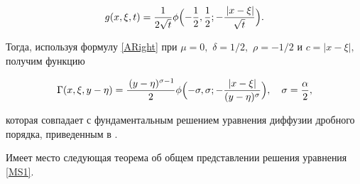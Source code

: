 $$

g(x,\xi,t)=\frac{1}{2\sqrt{t}}\phi\Bigl(-\frac{1}{2}, \frac{1}{2};- \frac{\,|x-\xi|}{\sqrt{t}}\Bigr).

$$

Тогда, используя формулу \eqref{ARight} при $\mu=0,$ $\delta=1/2,$ $\rho=-1/2$ и  $c=|x-\xi|,$  получим функцию

$$

\Gamma(x,\xi,y-\eta)=\frac{\,(y-\eta)^{\sigma-1}}{2} \phi\Bigl(-\sigma, \sigma;- \frac{|x-\xi|}{(y-\eta)^{\sigma}}\Bigr), 

\quad  \sigma=\frac{\alpha}{2},

$$

которая совпадает  с фундаментальным решением уравнения диффузии дробного порядка, приведенным в \cite[с.~127]{Pskhu}.



\smallskip







Имеет место следующая теорема об общем представлении решения уравнения \eqref{MS1}.



\smallskip



\hypertarget{kh:thm}{}



